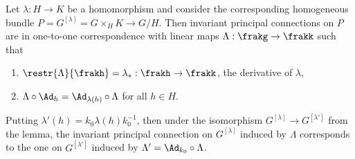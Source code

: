\begin{thm}\label{thm 1.4.5 Cap}
    Let $\lambda:H\to K$ be a homomorphism and consider the corresponding homogeneous bundle $P=G^{[\lambda]}=G\times_H K\to G\slash H$. Then invariant principal connections on $P$ are in one-to-one correspondence with linear maps $\Lambda:\frakg\to \frakk$ such that 
    \begin{enumerate}[label=(\roman*)]
        \item $\restr{\Lambda}{\frakh}=\lambda_\ast:\frakh\to \frakk$, the derivative of $\lambda$,
        \item $\Lambda\circ \Ad_h=\Ad_{\lambda(h)}\circ\Lambda$ for all $h\in H$.
    \end{enumerate}
    Putting $\lambda'(h)=k_0\lambda(h)k_0^{-1}$, then under the isomorphism $G^{[\lambda]}\to G^{[\lambda']}$ from the lemma, the invariant principal connection on $G^{[\lambda]}$ induced by $\Lambda$ corresponds to the one on $G^{[\lambda']}$ induced by $\Lambda'=\Ad_{k_0}\circ\Lambda$.
\end{thm}
